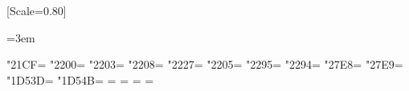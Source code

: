 %

\usepackage{fontspec}
\usepackage{unicode-math}
\setmainfont{Times New Roman}
\setmonofont{Cascadia Mono}[Scale=0.80]
\usepackage{newunicodechar}

\usepackage{amsmath,amssymb,amsthm}
\usepackage[margin=1in]{geometry}
\usepackage{longtable,booktabs,array}
\usepackage{microtype}
\usepackage{enumitem}

\usepackage[dvipsnames]{xcolor}
\usepackage[colorlinks=true,linkcolor=RoyalBlue,urlcolor=RoyalBlue,
            citecolor=RoyalBlue,breaklinks=true]{hyperref}
\usepackage{fvextra}
\usepackage{framed}

\setlength{\tabcolsep}{4pt}
\renewcommand{\arraystretch}{1.15}

\providecommand{\tightlist}{%
  \setlength{\itemsep}{0pt}\setlength{\parskip}{0pt}}

\renewenvironment{quote}
  {\begin{leftbar}\small}
  {\end{leftbar}}

\usepackage[htt]{hyphenat}
\usepackage{xurl}
\emergencystretch=3em
\sloppy
\hfuzz=0pt
\vfuzz=0pt

\newfontfamily{}
\newXeTeXintercharclass\paperSymbolClass
\XeTeXcharclass"21CF=\paperSymbolClass
\XeTeXcharclass"2200=\paperSymbolClass
\XeTeXcharclass"2203=\paperSymbolClass
\XeTeXcharclass"2208=\paperSymbolClass
\XeTeXcharclass"2227=\paperSymbolClass
\XeTeXcharclass"2205=\paperSymbolClass
\XeTeXcharclass"2295=\paperSymbolClass
\XeTeXcharclass"2294=\paperSymbolClass
\XeTeXcharclass"27E8=\paperSymbolClass
\XeTeXcharclass"27E9=\paperSymbolClass
\XeTeXcharclass"1D53D=\paperSymbolClass
\XeTeXcharclass"1D54B=\paperSymbolClass
{} \paperSymbolClass={\begingroup\paperSymbolFont}
\XeTeXinterchartoks {}={\endgroup}
 \paperSymbolClass={\begingroup\paperSymbolFont}
\XeTeXinterchartoks {}={\endgroup}

\DeclareRobustCommand{\texttt}[1]{{\paperSymbolFont\nolinkurl{#1}}}

